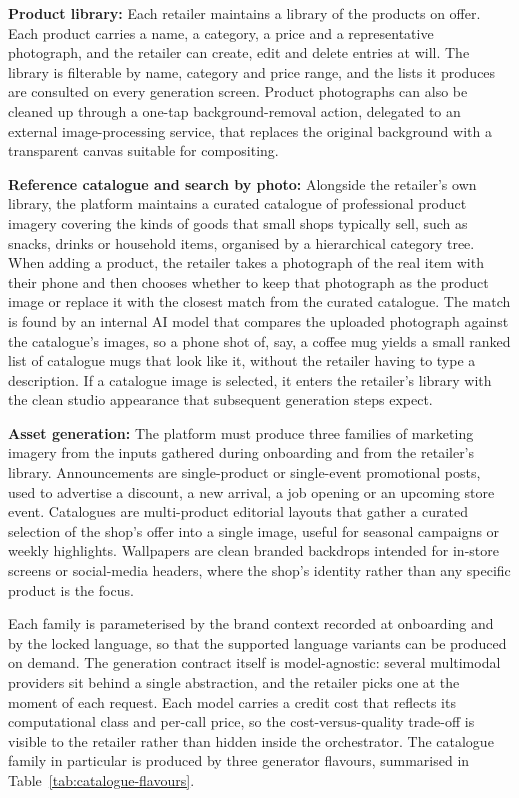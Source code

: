 \textbf{Product library:} Each retailer maintains a library of the products on offer. Each product carries a name, a category, a price and a representative photograph, and the retailer can create, edit and delete entries at will. The library is filterable by name, category and price range, and the lists it produces are consulted on every generation screen. Product photographs can also be cleaned up through a one-tap background-removal action, delegated to an external image-processing service, that replaces the original background with a transparent canvas suitable for compositing.

\textbf{Reference catalogue and search by photo:} Alongside the retailer's own library, the platform maintains a curated catalogue of professional product imagery covering the kinds of goods that small shops typically sell, such as snacks, drinks or household items, organised by a hierarchical category tree. When adding a product, the retailer takes a photograph of the real item with their phone and then chooses whether to keep that photograph as the product image or replace it with the closest match from the curated catalogue. The match is found by an internal AI model that compares the uploaded photograph against the catalogue's images, so a phone shot of, say, a coffee mug yields a small ranked list of catalogue mugs that look like it, without the retailer having to type a description. If a catalogue image is selected, it enters the retailer's library with the clean studio appearance that subsequent generation steps expect.

\textbf{Asset generation:}\label{par:asset-generation} The platform must produce three families of marketing imagery from the inputs gathered during onboarding and from the retailer's library. Announcements are single-product or single-event promotional posts, used to advertise a discount, a new arrival, a job opening or an upcoming store event. Catalogues are multi-product editorial layouts that gather a curated selection of the shop's offer into a single image, useful for seasonal campaigns or weekly highlights. Wallpapers are clean branded backdrops intended for in-store screens or social-media headers, where the shop's identity rather than any specific product is the focus.

Each family is parameterised by the brand context recorded at onboarding and by the locked language, so that the supported language variants can be produced on demand. The generation contract itself is model-agnostic: several multimodal providers sit behind a single abstraction, and the retailer picks one at the moment of each request. Each model carries a credit cost that reflects its computational class and per-call price, so the cost-versus-quality trade-off is visible to the retailer rather than hidden inside the orchestrator. The catalogue family in particular is produced by three generator flavours, summarised in Table~\ref{tab:catalogue-flavours}.

